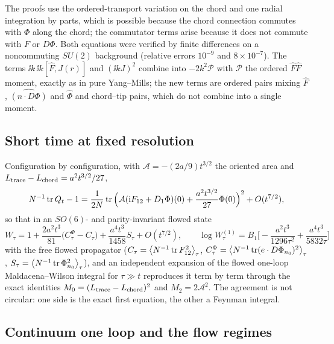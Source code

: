 The proofs use the ordered-transport variation on the chord and one radial integration by parts, which is
possible because the chord connection commutes with $\Phi$ along the chord; the commutator terms arise
because it does not commute with $F$ or $D\Phi$. Both equations were verified by finite differences on a
noncommuting $SU(2)$ background (relative errors $10^{-9}$ and $8\times10^{-7}$). The terms
$\ii k\,\ii k[\hat F,J(r)]$ and $(\ii kJ)^2$ combine into $-2k^2\mathcal P$ with $\mathcal P$ the ordered
$\hat F\hat F$ moment, exactly as in pure Yang--Mills; the new terms are ordered pairs mixing $\hat F$,
$\widehat{(\hat n\cdot D\Phi)}$ and $\hat\Phi$ and chord--tip pairs, which do not combine into a single moment.

\subsection{Short time at fixed resolution}

Configuration by configuration, with $\mathcal A=-(2a/9)t^{3/2}$ the oriented area and
$L_{\rm trace}-L_{\rm chord}=a^2t^{3/2}/27$,
\begin{equation}
N^{-1}\operatorname{tr} Q_t-1=\frac1{2N}\operatorname{tr}\Big(\mathcal A(\mathrm i F_{12}+D_1\Phi)(0)+\frac{a^2t^{3/2}}{27}\Phi(0)\Big)^2+O(t^{7/2}),
\end{equation}
so that in an $SO(6)$- and parity-invariant flowed state
\begin{equation}
W_\tau=1+\frac{2a^2t^3}{81}\big(C^\Phi_\tau-C_\tau\big)+\frac{a^4t^3}{1458}S_\tau+O(t^{7/2}),\qquad
\log W^{(1)}_\tau=B_1\Big[-\frac{a^2t^3}{1296\tau^2}+\frac{a^4t^3}{5832\tau}\Big]
\end{equation}
with the free flowed propagator ($C_\tau=\left\langle N^{-1}\operatorname{tr} F_{12}^2\right\rangle_\tau$, $C^\Phi_\tau=\left\langle N^{-1}\operatorname{tr}(e\cdot D\Phi_{n_0})^2\right\rangle_\tau$,
$S_\tau=\left\langle N^{-1}\operatorname{tr}\Phi_{n_0}^2\right\rangle_\tau$), and an independent
expansion of the flowed one-loop Maldacena--Wilson integral for $\tau\gg t$ reproduces it term by term through the
exact identities $M_0=(L_{\rm trace}-L_{\rm chord})^2$ and $M_2=2\mathcal A^2$. The agreement is not circular:
one side is the exact first equation, the other a Feynman integral.

\subsection{Continuum one loop and the flow regimes}

